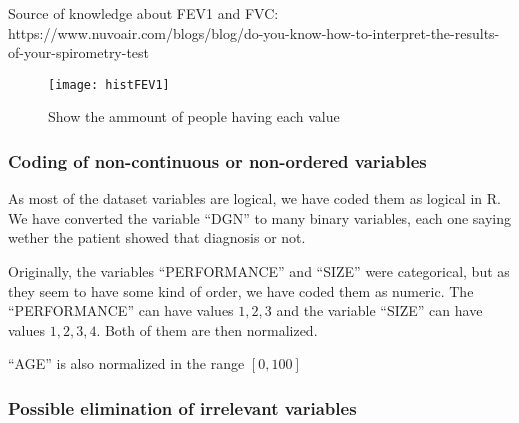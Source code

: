 Source of knowledge about FEV1 and FVC:
https://www.nuvoair.com/blogs/blog/do-you-know-how-to-interpret-the-results-of-your-spirometry-test






\begin{figure}[bh]
\centering
\texttt{[image: histFEV1]}
\label{fig:histFEV1}
\caption{Show the ammount of people having each value}
\end{figure}
\subsubsection{Coding of non-continuous or non-ordered variables}

%
%
%

As most of the dataset variables are logical, we have coded them as logical in R. We have converted the variable ``DGN'' to many binary variables, each one saying wether the patient showed that diagnosis or not.

Originally, the variables ``PERFORMANCE'' and ``SIZE'' were categorical, but as they seem to have some kind of order, we have coded them as numeric. The ``PERFORMANCE'' can have values \(1,2,3\) and the variable ``SIZE'' can have values \(1,2,3,4\). Both of them are then normalized.

``AGE'' is also normalized in the range \([0, 100]\)

\subsubsection{Possible elimination of irrelevant variables}


